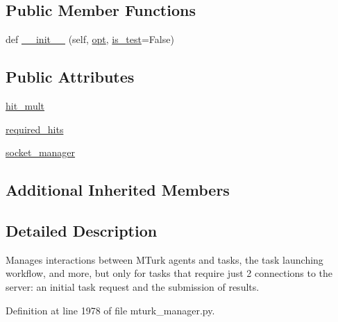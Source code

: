 \subsection*{Public Member Functions}
\begin{DoxyCompactItemize}
\item 
def \hyperlink{classparlai_1_1mturk_1_1core_1_1legacy__2018_1_1mturk__manager_1_1StaticMTurkManager_a4a658ba3ab68e770cb5dcccdd272aa3b}{\+\_\+\+\_\+init\+\_\+\+\_\+} (self, \hyperlink{classparlai_1_1mturk_1_1core_1_1legacy__2018_1_1mturk__manager_1_1MTurkManager_a4ae5366245bb4ddfeb732140e1a0df10}{opt}, \hyperlink{classparlai_1_1mturk_1_1core_1_1legacy__2018_1_1mturk__manager_1_1MTurkManager_a1bbfe2403cd6c1c0d967e00d313e8786}{is\+\_\+test}=False)
\end{DoxyCompactItemize}
\subsection*{Public Attributes}
\begin{DoxyCompactItemize}
\item 
\hyperlink{classparlai_1_1mturk_1_1core_1_1legacy__2018_1_1mturk__manager_1_1StaticMTurkManager_af82dc6428ef8050ce1932a452d728936}{hit\+\_\+mult}
\item 
\hyperlink{classparlai_1_1mturk_1_1core_1_1legacy__2018_1_1mturk__manager_1_1StaticMTurkManager_aff32644e98ae2b42a14e4537035bfc12}{required\+\_\+hits}
\item 
\hyperlink{classparlai_1_1mturk_1_1core_1_1legacy__2018_1_1mturk__manager_1_1StaticMTurkManager_aa1c3f5147008b0e954d5d8a66f94e011}{socket\+\_\+manager}
\end{DoxyCompactItemize}
\subsection*{Additional Inherited Members}


\subsection{Detailed Description}
\begin{DoxyVerb}Manages interactions between MTurk agents and tasks, the task launching workflow,
and more, but only for tasks that require just 2 connections to the server: an
initial task request and the submission of results.
\end{DoxyVerb}
 

Definition at line 1978 of file mturk\+\_\+manager.\+py.




